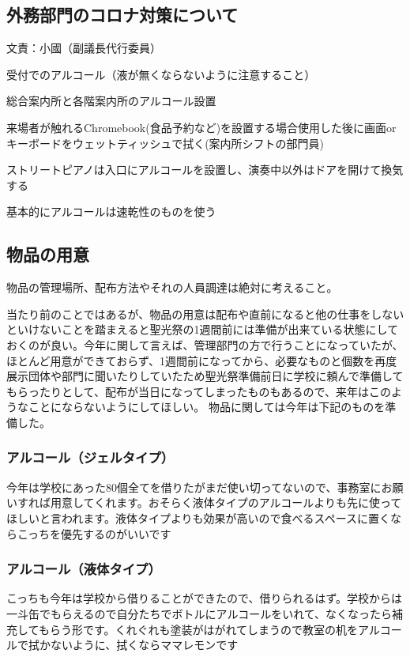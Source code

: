 \documentclass[a4paper]{ltjsreport}
\begin{document}
\subsection{外務部門のコロナ対策について} 文責：小國（副議長代行委員） \vspace{2mm}

受付でのアルコール（液が無くならないように注意すること）

総合案内所と各階案内所のアルコール設置

来場者が触れるChromebook(食品予約など)を設置する場合使用した後に画面orキーボードをウェットティッシュで拭く(案内所シフトの部門員)

ストリートピアノは入口にアルコールを設置し、演奏中以外はドアを開けて換気する

基本的にアルコールは速乾性のものを使う

\subsection{物品の用意}
物品の管理場所、配布方法やそれの人員調達は絶対に考えること。

当たり前のことではあるが、物品の用意は配布や直前になると他の仕事をしないといけないことを踏まえると聖光祭の1週間前には準備が出来ている状態にしておくのが良い。今年に関して言えば、管理部門の方で行うことになっていたが、ほとんど用意ができておらず、1週間前になってから、必要なものと個数を再度展示団体や部門に聞いたりしていたため聖光祭準備前日に学校に頼んで準備してもらったりとして、配布が当日になってしまったものもあるので、来年はこのようなことにならないようにしてほしい。
物品に関しては今年は下記のものを準備した。
\subsubsection{アルコール（ジェルタイプ）}今年は学校にあった80個全てを借りたがまだ使い切ってないので、事務室にお願いすれば用意してくれます。おそらく液体タイプのアルコールよりも先に使ってほしいと言われます。液体タイプよりも効果が高いので食べるスペースに置くならこっちを優先するのがいいです

\subsubsection{アルコール（液体タイプ）}
こっちも今年は学校から借りることができたので、借りられるはず。学校からは一斗缶でもらえるので自分たちでボトルにアルコールをいれて、なくなったら補充してもらう形です。くれぐれも塗装がはがれてしまうので教室の机をアルコールで拭かないように、拭くならママレモンです
\end{document}
